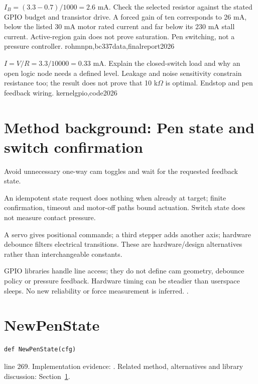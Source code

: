 {$I_B=(3.3-0.7)/1000=2.6$ mA.}
{Check the selected resistor against the stated GPIO budget and transistor
drive. A forced gain of ten corresponds to 26 mA, below the listed 30 mA
motor rated current and far below its 230 mA stall current. Active-region gain
does not prove saturation.}
{Pen switching, not a pressure controller.}
{rohmnpn,bc337data,finalreport2026}

{$I=V/R=3.3/10000=0.33$ mA.}
{Explain the closed-switch load and why an open logic node needs a defined
level. Leakage and noise sensitivity constrain resistance too; the result
does not prove that 10 k$\Omega$ is optimal.}
{Endstop and pen feedback wiring.}
{kernelgpio,code2026}


\section{Method background: Pen state and switch confirmation}\label{method:pen}
Avoid unnecessary one-way cam toggles and wait for the requested feedback state.


An idempotent state request does nothing when already at target; finite confirmation, timeout and motor-off paths bound actuation. Switch state does not measure contact pressure.


A servo gives positional commands; a third stepper adds another axis; hardware debounce filters electrical transitions. These are hardware/design alternatives rather than interchangeable constants.


GPIO libraries handle line access; they do not define cam geometry, debounce policy or pressure feedback. Hardware timing can be steadier than userspace sleeps. No new reliability or force measurement is inferred. \cite{kernelgpio,rohmnpn,code2026}.


\section{NewPenState}\label{fn:reproduce:NewPenState}
\begin{lstlisting}[style=sig]
def NewPenState(cfg)
\end{lstlisting}
 line 269. Implementation evidence: \cite{code2026}. Related method, alternatives and library discussion: Section~\ref{method:pen}.


